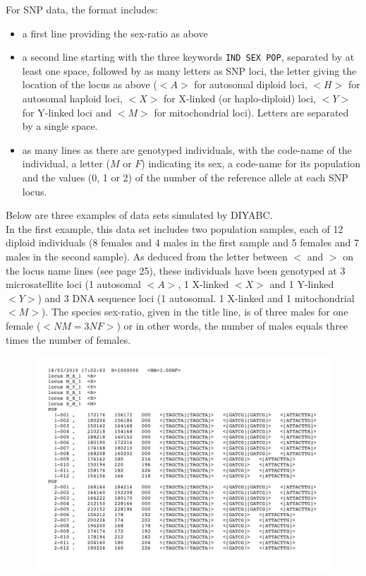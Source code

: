 For SNP data, the format includes:
\begin{itemize}
 \item a first line providing the sex-ratio as above
 \item a second line starting with the three keywords \texttt{IND  SEX  POP}, separated by at least one space, followed by as many letters as SNP loci, the letter giving the location of the locus as above ($<A>$ for autosomal diploid loci, $<H>$ for autosomal haploid loci, $<X>$ for X-linked (or haplo-diploid) loci, $<Y>$ for Y-linked loci and $<M>$ for mitochondrial loci). Letters are separated by a single space.
 \item as many lines as there are genotyped individuals, with the code-name of the individual, a letter ($M$ or $F$) indicating its sex, a code-name for its population and the values (0, 1 or 2) of the number of the reference allele at each SNP locus. 
\end{itemize}


 
Below are three examples of data sets simulated by DIYABC.\\ In the first example, this data set includes two population samples, each of 12 diploid individuals (8 females and 4 males in the first sample and 5 females and 7 males in the second sample). As deduced from the letter between $<$ and $>$ on the locus name lines (see page 25), these individuals have been genotyped at 3 microsatellite loci (1 autosomal $<A>$, 1 X-linked $<X>$ and 1 Y-linked $<Y>$) and 3 DNA sequence loci (1 autosomal. 1 X-linked and 1 mitochondrial $<M>$). The species sex-ratio, given in the title line, is of three males for one female ($<NM=3NF>$) or in other words, the number of males equals three times the number of females. 
\begin{figure}[h]
\includegraphics[scale=0.7]{gui_pictures/screenga001.png}
\end{figure}

